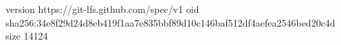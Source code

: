 version https://git-lfs.github.com/spec/v1
oid sha256:34e8f29d24d8eb419f1aa7e835bbf89d10c146baf512df4aefea2546bed20c4d
size 14124
